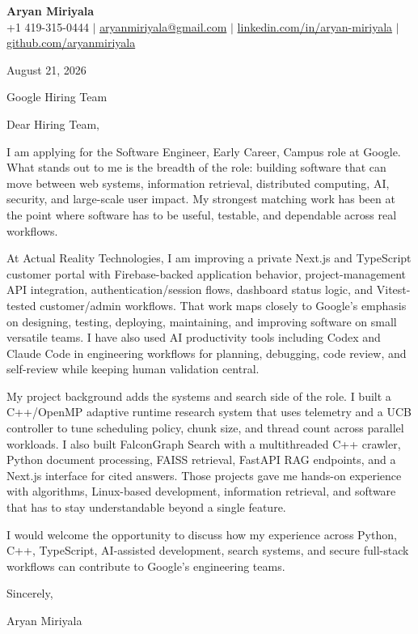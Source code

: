 \documentclass[letterpaper,11pt]{article}
\begin{document}
\begin{center}
  {\Large \textbf{Aryan Miriyala}}\\
  \small
  +1 419-315-0444 $|$
  \href{mailto:aryanmiriyala@gmail.com}{aryanmiriyala@gmail.com} $|$
  \href{https://www.linkedin.com/in/aryan-miriyala-7788a21b6/}{linkedin.com/in/aryan-miriyala} $|$
  \href{https://github.com/aryanmiriyala}{github.com/aryanmiriyala}
\end{center}

August 21, 2026

Google Hiring Team

Dear Hiring Team,

I am applying for the Software Engineer, Early Career, Campus role at Google. What stands out to me is the breadth of the role: building software that can move between web systems, information retrieval, distributed computing, AI, security, and large-scale user impact. My strongest matching work has been at the point where software has to be useful, testable, and dependable across real workflows.

At Actual Reality Technologies, I am improving a private Next.js and TypeScript customer portal with Firebase-backed application behavior, project-management API integration, authentication/session flows, dashboard status logic, and Vitest-tested customer/admin workflows. That work maps closely to Google's emphasis on designing, testing, deploying, maintaining, and improving software on small versatile teams. I have also used AI productivity tools including Codex and Claude Code in engineering workflows for planning, debugging, code review, and self-review while keeping human validation central.

My project background adds the systems and search side of the role. I built a C++/OpenMP adaptive runtime research system that uses telemetry and a UCB controller to tune scheduling policy, chunk size, and thread count across parallel workloads. I also built FalconGraph Search with a multithreaded C++ crawler, Python document processing, FAISS retrieval, FastAPI RAG endpoints, and a Next.js interface for cited answers. Those projects gave me hands-on experience with algorithms, Linux-based development, information retrieval, and software that has to stay understandable beyond a single feature.

I would welcome the opportunity to discuss how my experience across Python, C++, TypeScript, AI-assisted development, search systems, and secure full-stack workflows can contribute to Google's engineering teams.

Sincerely,

Aryan Miriyala
\end{document}

